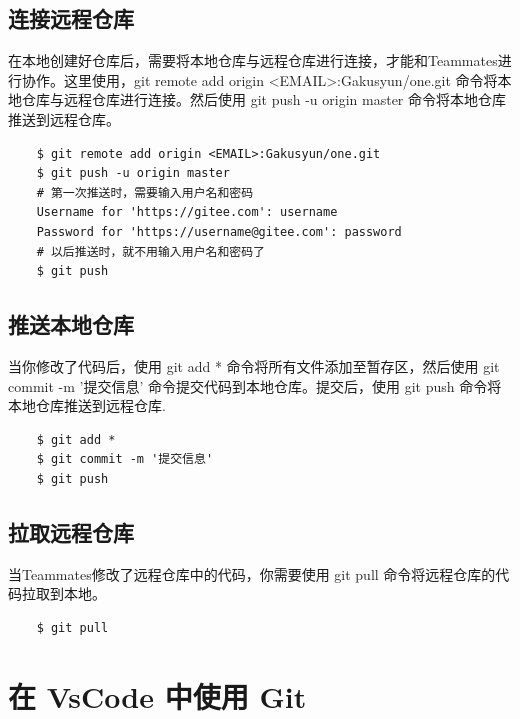 \documentclass[UTF8]{ctexart}
\begin{document}
\subsection{连接远程仓库}
在本地创建好仓库后，需要将本地仓库与远程仓库进行连接，才能和Teammates进行协作。这里使用，git remote add origin <EMAIL>:Gakusyun/one.git 命令将本地仓库与远程仓库进行连接。然后使用 git push -u origin master 命令将本地仓库推送到远程仓库。
\begin{verbatim}
    $ git remote add origin <EMAIL>:Gakusyun/one.git
    $ git push -u origin master
    # 第一次推送时，需要输入用户名和密码
    Username for 'https://gitee.com': username
    Password for 'https://username@gitee.com': password
    # 以后推送时，就不用输入用户名和密码了
    $ git push
\end{verbatim}
\subsection{推送本地仓库}
当你修改了代码后，使用 git add * 命令将所有文件添加至暂存区，然后使用 git commit -m '提交信息' 命令提交代码到本地仓库。提交后，使用 git push 命令将本地仓库推送到远程仓库.
\begin{verbatim}
    $ git add *
    $ git commit -m '提交信息'
    $ git push
\end{verbatim}
\subsection{拉取远程仓库}
当Teammates修改了远程仓库中的代码，你需要使用 git pull 命令将远程仓库的代码拉取到本地。
\begin{verbatim}
    $ git pull
\end{verbatim}
\newpage
\section{在 VsCode 中使用 Git}
\end{document}
